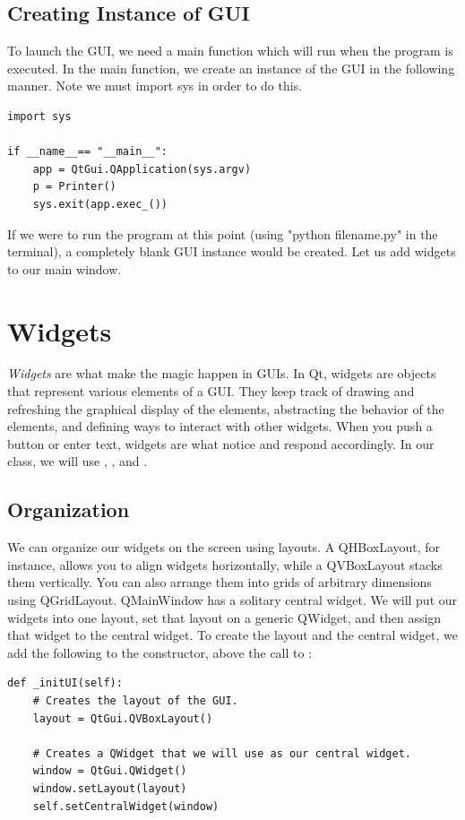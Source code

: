 \subsection*{Creating Instance of GUI}
To launch the GUI, we need a main function which will run when the program is executed.  In the main function, we create an instance of the GUI in the following manner.  Note we must import sys in order to do this.
\begin{lstlisting}
import sys

if __name__== "__main__":
    app = QtGui.QApplication(sys.argv)
    p = Printer()
    sys.exit(app.exec_())
\end{lstlisting}

If we were to run the program at this point (using "python filename.py" in the terminal), a completely blank GUI instance would be created.  Let us add widgets to our main window.

\section*{Widgets}
\emph{Widgets} are what make the magic happen in GUIs.
In Qt, widgets are objects that represent various elements of a GUI.
They keep track of drawing and refreshing the graphical display of the elements, abstracting the behavior of the elements, and defining ways to interact with other widgets.
When you push a button or enter text, widgets are what notice and respond accordingly.
In our  class, we will use , , and .

\subsection*{Organization}
We can organize our widgets on the screen using layouts.  A QHBoxLayout, for instance, allows you to align widgets horizontally, while a QVBoxLayout stacks them vertically.  You can also arrange them into grids of arbitrary dimensions using QGridLayout.  QMainWindow has a solitary central widget.  We will put our widgets into one layout, set that layout on a generic QWidget, and then assign that widget to the central widget.  To create the layout and the central widget, we add the following to the constructor, above the call to : 
\begin{lstlisting}
def _initUI(self):
	# Creates the layout of the GUI.
	layout = QtGui.QVBoxLayout()

	# Creates a QWidget that we will use as our central widget.
	window = QtGui.QWidget()
	window.setLayout(layout)
	self.setCentralWidget(window)
\end{lstlisting}

